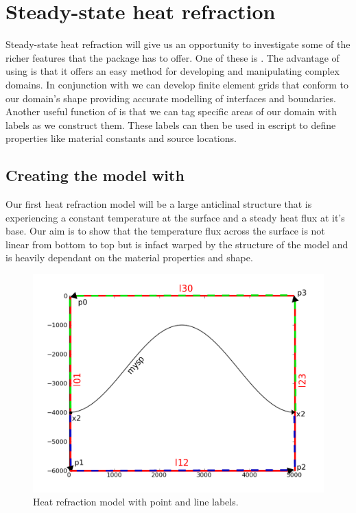 
%
%
%

\section{Steady-state heat refraction}
Steady-state heat refraction will give us an opportunity to investigate some of the richer features that the \esc package has to offer. One of these is \pycad . The advantage of using \pycad is that it offers an easy method for developing and manipulating complex domains. In conjunction with \gmsh we can develop finite element grids that conform to our domain's shape providing accurate modelling of interfaces and boundaries. Another useful function of \pycad is that we can tag specific areas of our domain with labels as we construct them. These labels can then be used in escript to define properties like material constants and source locations. 

\subsection{Creating the model with \pycad}

Our first heat refraction model will be a large anticlinal structure that is experiencing a constant temperature at the surface and a steady heat flux at it's base. Our aim is to show that the temperature flux across the surface is not linear from bottom to top but is infact warped by the structure of the model and is heavily dependant on the material properties and shape.

\begin{figure}[h!]
\centerline{\includegraphics[width=4.in]{figures/anticlineheatrefraction}}
\caption{Heat refraction model with point and line labels.}
\label{fig:anticlinehrmodel}
\end{figure}

